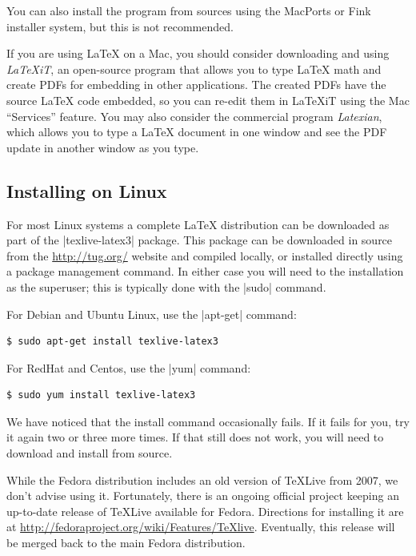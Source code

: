 You can also install the program from sources using the MacPorts or Fink
installer system, but this is not recommended. 

If you are using \LaTeX{} on a Mac, you should consider downloading and using
\emph{LaTeXiT}, an open-source program that allows you to type \LaTeX{} math
and create PDFs for embedding in other applications. The created PDFs have the
source \LaTeX{} code embedded, so you can re-edit them in LaTeXiT using the Mac
``Services'' feature.  You may also consider the commercial program
\emph{Latexian}, which allows you to type a \LaTeX{} document in one window and
see the PDF update in another window as you type.

\subsection{Installing on Linux}

For most Linux systems a complete \LaTeX{} distribution can be downloaded as
part of the |texlive-latex3| package. This package can be downloaded in source
from the \url{http://tug.org/} website and compiled locally, or installed
directly using a package management command. In either case you will need to
the installation as the superuser; this is typically done with the |sudo|
command.

For Debian and Ubuntu Linux, use the |apt-get| command:

\begin{Verbatim}
$ sudo apt-get install texlive-latex3
\end{Verbatim}

For RedHat and Centos, use the |yum| command:

\begin{Verbatim}
$ sudo yum install texlive-latex3
\end{Verbatim}

We have noticed that the install command occasionally fails. If it fails for
you, try it again two or three more times. If that still does not work, you
will need to download and install from source.

While the Fedora distribution includes an old version of \TeX Live from 2007,
we don't advise using it.  Fortunately, there is an ongoing official project
keeping an up-to-date release of \TeX Live available for Fedora.  Directions
for installing it are at \url{http://fedoraproject.org/wiki/Features/TeXlive}.
Eventually, this release will be merged back to the main Fedora distribution.


